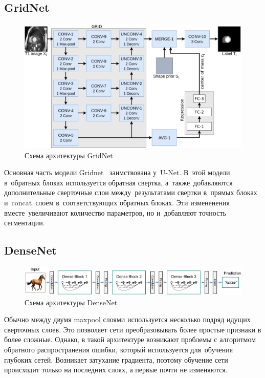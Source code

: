 \subsection{GridNet}

\begin{figure}[ht]
  \includegraphics[width=\textwidth,keepratio]{img/gridnet}
  \caption{Схема архитектуры GridNet}
\end{figure}

Основная часть модели Gridnet~\cite{gridnet} заимствована у~U-Net. 
В~этой модели в~обратных блоках используется обратная свертка, 
а~также~добавляются дополнительные сверточные слои между~результатами 
свертки в~прямых блоках и~concat~слоем в~соответствующих обратных блоках. 
Эти измененения вместе~увеличивают количество параметров, но и~добавляют
точность сегментации.

\subsection{DenseNet}

\begin{figure}[ht]
  \includegraphics[width=\textwidth,keepratio]{img/densenet}
  \caption{Схема архитектуры DenseNet}
\end{figure}

Обычно между двумя maxpool слоями используется несколько подряд идущих сверточных слоев. Это позволяет сети преобразовывать более простые признаки в более сложные. Однако, в такой архитектуре возникают проблемы с алгоритмом обратного распространения ошибки, который используется для~обучения глубоких сетей. Возникает затухание градиента, поэтому обучение сети происходит только на последних слоях, а первые почти не изменяются. 

